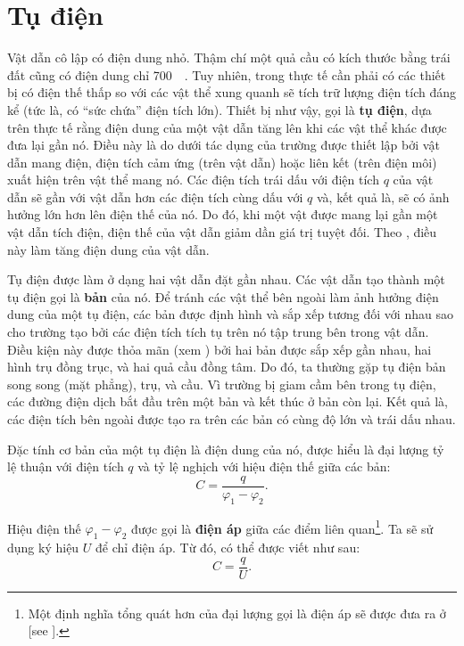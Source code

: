 \section{Tụ điện}\label{sec:3_4}

Vật dẫn cô lập có điện dung nhỏ. Thậm chí một quả cầu có kích thước bằng trái đất cũng có điện dung chỉ \SI{700}{\micro\faraday}. Tuy nhiên, trong thực tế cần phải có các thiết bị có điện thế thấp so với các vật thể xung quanh sẽ tích trữ lượng điện tích đáng kể (tức là, có ``sức chứa'' điện tích lớn). Thiết bị như vậy, gọi là \textbf{tụ điện}, dựa trên thực tế rằng điện dung của một vật dẫn tăng lên khi các vật thể khác được đưa lại gần nó. Điều này là do dưới tác dụng của trường được thiết lập bởi vật dẫn mang điện, điện tích cảm ứng (trên vật dẫn) hoặc liên kết (trên điện môi) xuất hiện trên vật thể mang nó. Các điện tích trái dấu với điện tích $q$ của vật dẫn sẽ gần với vật dẫn hơn các điện tích cùng dấu với $q$ và, kết quả là, sẽ có ảnh hưởng lớn hơn lên điện thế của nó. Do đó, khi một vật được mang lại gần một vật dẫn tích điện, điện thế của vật dẫn giảm dần giá trị tuyệt đối. Theo , điều này làm tăng điện dung của vật dẫn.

Tụ điện được làm ở dạng hai vật dẫn đặt gần nhau. Các vật dẫn tạo thành một tụ điện gọi là \textbf{bản} của nó. Để tránh các vật thể bên ngoài làm ảnh hưởng điện dung của một tụ điện, các bản được định hình và sắp xếp tương đối với nhau sao cho trường tạo bởi các điện tích tích tụ trên nó tập trung bên trong vật dẫn. Điều kiện này được thỏa mãn (xem ) bởi hai bản được sắp xếp gần nhau, hai hình trụ đồng trục, và hai quả cầu đồng tâm. Do đó, ta thường gặp tụ điện bản song song (mặt phẳng), trụ, và cầu. Vì trường bị giam cầm bên trong tụ điện, các đường điện dịch bắt đầu trên một bản và kết thúc ở bản còn lại. Kết quả là, các điện tích bên ngoài được tạo ra trên các bản có cùng độ lớn và trái dấu nhau.

Đặc tính cơ bản của một tụ điện là điện dung của nó, được hiểu là đại lượng tỷ lệ thuận với điện tích $q$ và tỷ lệ nghịch với hiệu điện thế giữa các bản:
\begin{equation}\label{eq:3_10}
    C = \frac{q}{\varphi_1 - \varphi_2}.
\end{equation}

Hiệu điện thế $\varphi_1-\varphi_2$ được gọi là \textbf{điện áp} giữa các điểm liên quan\footnote{Một định nghĩa tổng quát hơn của đại lượng gọi là điện áp sẽ được đưa ra ở  [see ].}. Ta sẽ sử dụng ký hiệu $U$ để chỉ điện áp. Từ đó,  có thể được viết như sau:
\begin{equation}\label{eq:3_11}
    C = \frac{q}{U}.
\end{equation}

